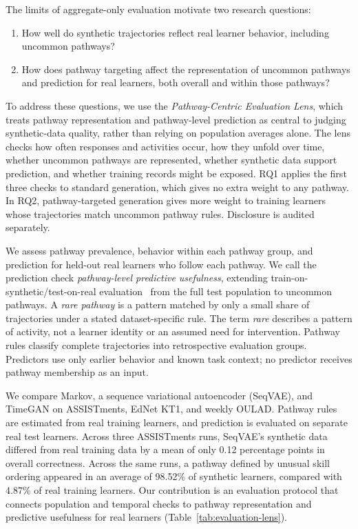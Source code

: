\documentclass[fleqn,10pt]{JLA_article}
\begin{document}
The limits of aggregate-only evaluation motivate two research questions:

\begin{samepage}
\begin{enumerate}[label=\textbf{RQ\arabic*.}, leftmargin=*,topsep=4pt,itemsep=4pt,parsep=0pt]
    \item How well do synthetic trajectories reflect real learner behavior, including uncommon pathways?
    \item How does pathway targeting affect the representation of uncommon pathways and prediction for real learners, both overall and within those pathways?
\end{enumerate}
\end{samepage}

To address these questions, we use the \emph{Pathway-Centric Evaluation Lens}, which treats pathway representation and pathway-level prediction as central to judging synthetic-data quality, rather than relying on population averages alone. The lens checks how often responses and activities occur, how they unfold over time, whether uncommon pathways are represented, whether synthetic data support prediction, and whether training records might be exposed. RQ1 applies the first three checks to standard generation, which gives no extra weight to any pathway. In RQ2, pathway-targeted generation gives more weight to training learners whose trajectories match uncommon pathway rules. Disclosure is audited separately.

We assess pathway prevalence, behavior within each pathway group, and prediction for held-out real learners who follow each pathway. We call the prediction check \emph{pathway-level predictive usefulness}, extending train-on-synthetic/test-on-real evaluation~\cite{esteban2017realvalued,yoon2019timegan,flanagan2022fine} from the full test population to uncommon pathways. A \emph{rare pathway} is a pattern matched by only a small share of trajectories under a stated dataset-specific rule. The term \emph{rare} describes a pattern of activity, not a learner identity or an assumed need for intervention. Pathway rules classify complete trajectories into retrospective evaluation groups. Predictors use only earlier behavior and known task context; no predictor receives pathway membership as an input.

We compare Markov, a sequence variational autoencoder (SeqVAE), and TimeGAN on ASSISTments, EdNet KT1, and weekly OULAD. Pathway rules are estimated from real training learners, and prediction is evaluated on separate real test learners. Across three ASSISTments runs, SeqVAE's synthetic data differed from real training data by a mean of only 0.12 percentage points in overall correctness. Across the same runs, a pathway defined by unusual skill ordering appeared in an average of 98.52\% of synthetic learners, compared with 4.87\% of real training learners. Our contribution is an evaluation protocol that connects population and temporal checks to pathway representation and predictive usefulness for real learners (Table~\ref{tab:evaluation-lens}).
\end{document}
